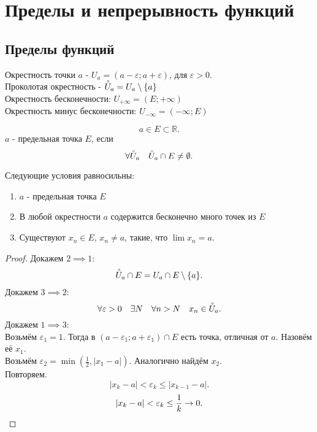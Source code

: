 \documentclass[11pt, oneside]{article}   	%
\begin{document}
\section{Пределы и непрерывность функций}
    \subsection{Пределы функций}
        \begin{definition}
            Окрестность точки $a$ - $U_a = \left( a-\varepsilon; a+\varepsilon \right) $, для $\varepsilon > 0$.\\
            Проколотая окрестность - $\accentset{\circ}{U}_a = U_a \setminus \{a\} $ \\
            Окрестность бесконечности: $U_{+\infty} = \left( E; +\infty \right) $ \\
            Окрестность минус бесконечности: $U_{-\infty} = \left( -\infty; E \right) $
        \end{definition}
        \begin{definition}
            \[ a\in E \subset \mathbb{R} .\] 
            $a$ - предельная точка $E$, если
            \[ \forall{\accentset{\circ}{U}_a}\quad \accentset{\circ}{U}_a\cap E \neq \emptyset .\] 
        \end{definition}
        \begin{theorem}
            Следующие условия равносильны:\\
            \begin{enumerate}
                \item $a$ - предельная точка $E $
                \item В любой окрестности $a$ содержится бесконечно много точек из $E$ 
                \item Существуют $x_n\in E$, $x_n \neq a$, такие, что $\lim x_n = a$.
            \end{enumerate}
            \begin{proof}
                Докажем $2 \implies 1$:
                \[ \accentset{\circ}{U}_a\cap E = U_a\cap E \setminus \{a\}  .\] 
                Докажем $3 \implies 2$:
                \[ \forall{\varepsilon>0}\quad \exists{N}\quad \forall{n>N}\quad x_n\in \accentset{\circ}{U}_a .\]
                Докажем $1 \implies 3$:\\
                Возьмём $\varepsilon_1 = 1$. Тогда в $\left( a-\varepsilon_1; a+\varepsilon_1 \right)\cap E$ есть точка, отличная от $a$. Назовём её  $x_1$.\\
                Возьмём $\varepsilon_2 = \min\left( \frac{1}{2}, |x_1-a| \right) $. Аналогично найдём $x_2$.\\
                Повторяем.
                \[ |x_k-a| < \varepsilon_k \le |x_{k-1}-a| .\]
                \[ |x_k-a| < \varepsilon_k \le \frac{1}{k} \to 0 .\qedhere\] 
            \end{proof}
        \end{theorem}
\end{document}
